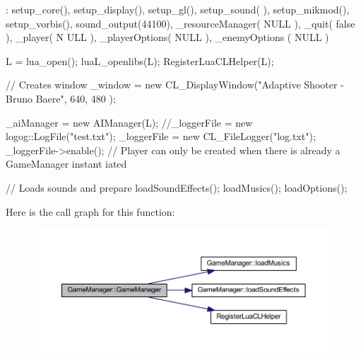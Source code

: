 \begin{DoxyCode}
                        : setup_core(), setup_display(), setup_gl(), setup_sound(
      ), setup_mikmod(), setup_vorbis(),
        sound_output(44100), _resourceManager( NULL ), _quit( false ), _player( N
      ULL ), _playerOptions( NULL ), _enemyOptions ( NULL )
{
        L = lua_open();
        luaL_openlibs(L);
        RegisterLuaCLHelper(L);

        // Creates window
        _window = new CL_DisplayWindow("Adaptive Shooter - Bruno Baere", 640, 480
      );

        _aiManager = new AIManager(L);
        //_loggerFile = new logog::LogFile("test.txt");
        _loggerFile = new CL_FileLogger("log.txt");
        _loggerFile->enable();
        // Player can only be created when there is already a GameManager instant
      iated

        // Loads sounds and prepare
        loadSoundEffects();
        loadMusics();
        loadOptions();
}
\end{DoxyCode}


Here is the call graph for this function:
\nopagebreak
\begin{figure}[H]
\begin{center}
\leavevmode
\includegraphics[width=400pt]{db/d10/class_game_manager_aa0e2424dc1a39d380e5b6605b179bf05_cgraph}
\end{center}
\end{figure}




